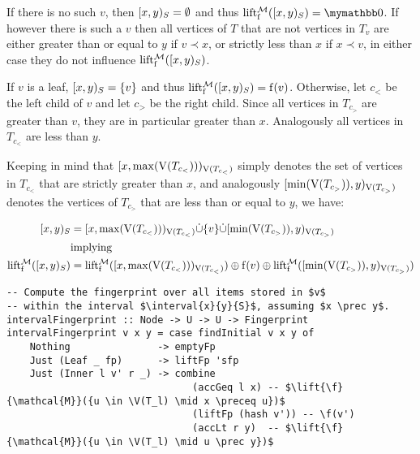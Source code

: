 If there is no such $v$, then $[{x},{y})_{S} = \emptyset$ and thus $\lift{\f}{\mathcal{M}}(\interval{x}{y}{S}) = \neutraladd$. If however there is such a $v$ then all vertices of $T$ that are not vertices in $T_v$ are either greater than or equal to $y$ if $v \prec x$, or strictly less than $x$ if $x \prec v$, in either case they do not influence $\operatorname{lift_{\operatorname{f}}^{\mathcal{M}}}([{x},{y})_{S})$.

If $v$ is a leaf, $[{x},{y})_{S} = \{v\}$ and thus $\operatorname{lift_{\operatorname{f}}^{\mathcal{M}}}([{x},{y})_{S}) = \operatorname{f}(v)$. Otherwise, let $c_{<}$ be the left child of $v$ and let $c_{>}$ be the right child. Since all vertices in $T_{c_{>}}$ are greater than $v$, they are in particular greater than $x$. Analogously all vertices in $T_{c_{<}}$ are less than $y$.

Keeping in mind that $[{x},{\max(\operatorname{V}(T_{c_{<}}))})_{\operatorname{V}(T_{c_{<}})}$ simply denotes the set of vertices in $T_{c_{<}}$ that are strictly greater than $x$, and analogously $[{\min(\operatorname{V}(T_{c_{>}}))},{y})_{\operatorname{V}(T_{c_{>}})}$ denotes the vertices of $T_{c_{>}}$ that are less than or equal to $y$, we have:

\begin{align*}
[{x},{y})_{S} &= {[{x},{\max(\operatorname{V}(T_{c_{<}}))})_{\operatorname{V}(T_{c_{<}})}} \dot{\cup} {{\{v\}} \dot{\cup} {[{\min(\operatorname{V}(T_{c_{>}}))},{y})_{\operatorname{V}(T_{c_{>}})}}}\\
&\mathrm{implying}\\
\operatorname{lift_{\operatorname{f}}^{\mathcal{M}}}([{x},{y})_{S}) &= {\operatorname{lift_{\operatorname{f}}^{\mathcal{M}}}([{x},{\max(\operatorname{V}(T_{c_{<}}))})_{\operatorname{V}(T_{c_{<}})})} \oplus {{\operatorname{f}(v)} \oplus{\operatorname{lift_{\operatorname{f}}^{\mathcal{M}}}([{\min(\operatorname{V}(T_{c_{>}}))},{y})_{\operatorname{V}(T_{c_{>}})})}}\\
\end{align*}

\begin{verbatim}
-- Compute the fingerprint over all items stored in $v$
-- within the interval $\interval{x}{y}{S}$, assuming $x \prec y$.
intervalFingerprint :: Node -> U -> U -> Fingerprint
intervalFingerprint v x y = case findInitial v x y of
    Nothing               -> emptyFp
    Just (Leaf _ fp)      -> liftFp 'sfp
    Just (Inner l v' r _) -> combine
                                (accGeq l x) -- $\lift{\f}{\mathcal{M}}({u \in \V(T_l) \mid x \preceq u})$ 
                                (liftFp (hash v')) -- \f(v')
                                (accLt r y)  -- $\lift{\f}{\mathcal{M}}({u \in \V(T_l) \mid u \prec y})$ 
\end{verbatim}

